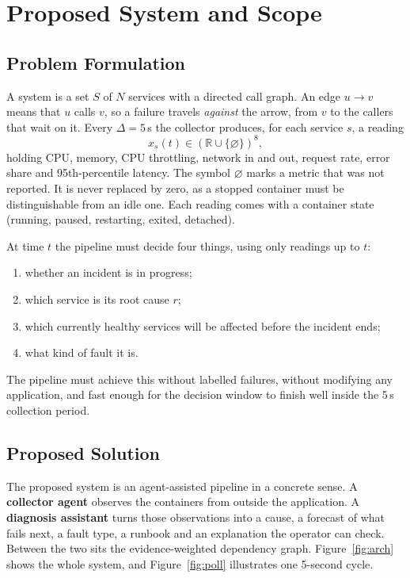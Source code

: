 \clearpage
\chapter[PROPOSED SYSTEM AND SCOPE]{Proposed System and Scope}
\label{ch:system}

\section{Problem Formulation}
A system is a set $S$ of $N$ services with a directed call graph. An edge $u \to v$ means that $u$ calls $v$, so a failure travels \emph{against} the arrow, from $v$ to the callers that wait on it. Every $\Delta = 5$\,s the collector produces, for each service $s$, a reading
\[
x_s(t) \in (\mathbb{R} \cup \{\varnothing\})^{8},
\]
holding CPU, memory, CPU throttling, network in and out, request rate, error share and 95th-percentile latency. The symbol $\varnothing$ marks a metric that was not reported. It is never replaced by zero, as a stopped container must be distinguishable from an idle one. Each reading comes with a container state (running, paused, restarting, exited, detached).

At time $t$ the pipeline must decide four things, using only readings up to $t$:
\begin{enumerate}[label=(\roman*)]
\item whether an incident is in progress;
\item which service is its root cause $r$;
\item which currently healthy services will be affected before the incident ends;
\item what kind of fault it is.
\end{enumerate}
The pipeline must achieve this without labelled failures, without modifying any application, and fast enough for the decision window to finish well inside the 5\,s collection period.

\section{Proposed Solution}
The proposed system is an agent-assisted pipeline in a concrete sense. A \textbf{collector agent} observes the containers from outside the application. A \textbf{diagnosis assistant} turns those observations into a cause, a forecast of what fails next, a fault type, a runbook and an explanation the operator can check. Between the two sits the evidence-weighted dependency graph. Figure~\ref{fig:arch} shows the whole system, and Figure~\ref{fig:poll} illustrates one 5-second cycle.

